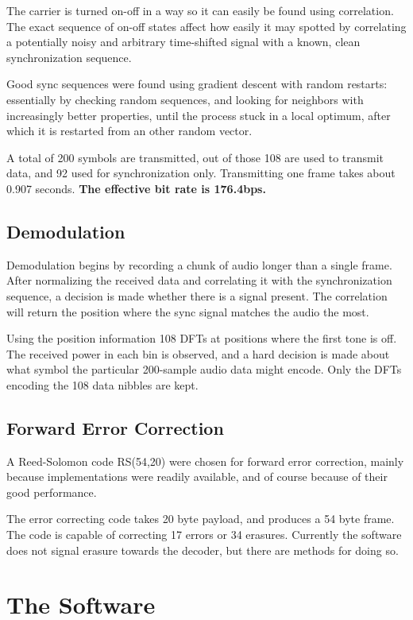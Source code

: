 \documentclass[a4paper]{article}
\begin{document}
The carrier is turned on-off in a way so it can easily be found using 
correlation. The exact sequence of on-off states affect how easily it 
may spotted by correlating a potentially noisy and arbitrary 
time-shifted signal with a known, clean synchronization sequence.

Good sync sequences were found using gradient descent with random 
restarts: essentially by checking random sequences, and looking for 
neighbors with increasingly better properties, until the process 
stuck in a local optimum, after which it is restarted from an other
random vector.

A total of 200 symbols are transmitted, out of those 108 are used to 
transmit data, and 92 used for synchronization only. Transmitting one 
frame takes about 0.907 seconds. \textbf{The effective bit rate is 
176.4bps.}

\subsection{Demodulation}

Demodulation begins by recording a chunk of audio longer than a single
frame. After normalizing the received data and correlating it with the
synchronization sequence, a decision is made whether there is a signal
present. The correlation will return the position where the sync signal
matches the audio the most.

Using the position information 108 DFTs at positions where the first
tone is off. The received power in each bin is observed, and a hard
decision is made about what symbol the particular 200-sample audio data
might encode. Only the DFTs encoding the 108 data nibbles are kept.

\subsection{Forward Error Correction}

A Reed-Solomon code RS(54,20) were chosen for forward error correction,
mainly because implementations were readily available, and of course
because of their good performance.

The error correcting code takes 20 byte payload, and produces a 54 byte
frame. The code is capable of correcting 17 errors or 34 erasures.
Currently the software does not signal erasure towards the decoder,
but there are methods\cite{ft1} for doing so.

\section{The Software}
\end{document}
